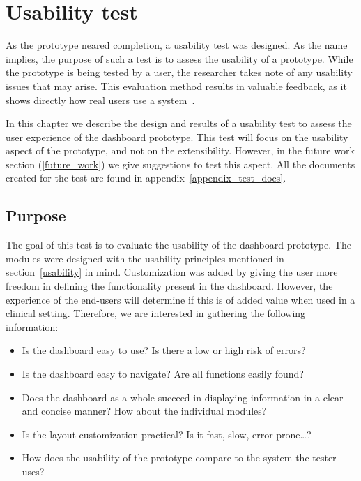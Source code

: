 \section{Usability test}\label{usabilitytest}

As the prototype neared completion, a usability test was designed. As the name implies, the purpose of such a test is to assess the usability of a prototype. While the prototype is being tested by a user, the researcher takes note of any usability issues that may arise. This evaluation method results in valuable feedback, as it shows directly how real users use a system~\cite{Nielsen1993, Lazar2017}.

In this chapter we describe the design and results of a usability test to assess the user experience of the dashboard prototype. This test will focus on the usability aspect of the prototype, and not on the extensibility. However, in the future work section (\ref{future_work}) we give suggestions to test this aspect. All the documents created for the test are found in appendix~\ref{appendix_test_docs}.

    \subsection{Purpose}

    The goal of this test is to evaluate the usability of the dashboard prototype. The modules were designed with the usability principles mentioned in section~\ref{usability} in mind. Customization was added by giving the user more freedom in defining the functionality present in the dashboard. However, the experience of the end-users will determine if this is of added value when used in a clinical setting. Therefore, we are interested in gathering the following information:
    \begin{itemize}
        \item Is the dashboard easy to use? Is there a low or high risk of errors?
        \item Is the dashboard easy to navigate? Are all functions easily found?
        \item Does the dashboard as a whole succeed in displaying information in a clear and concise manner? How about the individual modules?
        \item Is the layout customization practical? Is it fast, slow, error-prone\ldots?
        \item How does the usability of the prototype compare to the system the tester uses?
    \end{itemize}

